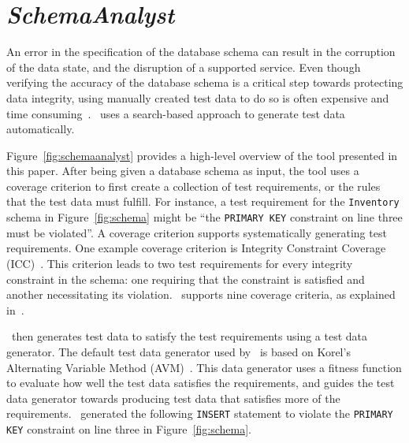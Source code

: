 \section{\textit{SchemaAnalyst}}\label{sec:technique}


An error in the specification of the database schema can result in the corruption of the data state, and the disruption
of a supported service.  Even though verifying the accuracy of the database schema is a critical step towards protecting
data integrity, using manually created test data to do so is often expensive and time
consuming~\cite{kapfhammer2013search}.  \sa~uses a search-based approach to generate test data automatically.


Figure~\ref{fig:schemaanalyst} provides a high-level overview of the tool presented in this paper.  After being given a
database schema as input, the tool uses a coverage criterion to first create a collection of test requirements, or the
rules that the test data must fulfill.  For instance, a test requirement for the \texttt{Inventory} schema in
Figure~\ref{fig:schema} might be ``the \texttt{PRIMARY KEY} constraint on line three must be violated''. A coverage
criterion supports systematically generating test requirements.  One example coverage criterion is Integrity Constraint
Coverage (ICC)~\cite{mcminn2015effectiveness}. This criterion leads to two test requirements for every integrity
constraint in the schema: one requiring that the constraint is satisfied and another necessitating its violation.
\sa~supports nine coverage criteria, as explained in~\cite{mcminn2015effectiveness}.


\sa~then generates test data to satisfy the test requirements using a test data generator. The default test data
generator used by \sa~is based on Korel's Alternating Variable Method (AVM)~\cite{Korel:AVM}.  This data generator uses
a fitness function to evaluate how well the test data satisfies the requirements, and guides the test data generator
towards producing test data that satisfies more of the requirements.  \sa~generated the following \texttt{INSERT}
statement to violate the \texttt{PRIMARY KEY} constraint on line three in Figure~\ref{fig:schema}.

